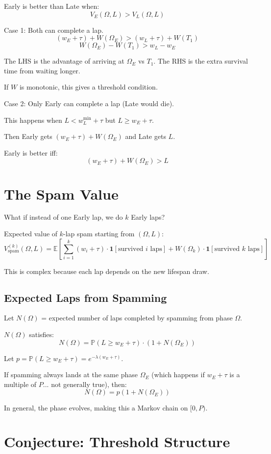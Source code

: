 \documentclass{article}
\newcommand{\E}{\mathbb{E}}
\newcommand{\Prob}{\mathbb{P}}
\newcommand{\ind}{\mathbf{1}}
\begin{document}
Early is better than Late when:
\[
V_E(\Omega, L) > V_L(\Omega, L)
\]

Case 1: Both can complete a lap.
\[
(w_E + \tau) + W(\Omega_E) > (w_L + \tau) + W(T_1)
\]
\[
W(\Omega_E) - W(T_1) > w_L - w_E
\]

The LHS is the advantage of arriving at $\Omega_E$ vs $T_1$.
The RHS is the extra survival time from waiting longer.

If $W$ is monotonic, this gives a threshold condition.

Case 2: Only Early can complete a lap (Late would die).

This happens when $L < w_L^{\min} + \tau$ but $L \geq w_E + \tau$.

Then Early gets $(w_E + \tau) + W(\Omega_E)$ and Late gets $L$.

Early is better iff:
\[
(w_E + \tau) + W(\Omega_E) > L
\]

\section{The Spam Value}

What if instead of one Early lap, we do $k$ Early laps?

Expected value of $k$-lap spam starting from $(\Omega, L)$:
\[
V_{\text{spam}}^{(k)}(\Omega, L) = \E\left[\sum_{i=1}^{k} (w_i + \tau) \cdot \ind[\text{survived } i \text{ laps}] + W(\Omega_k) \cdot \ind[\text{survived } k \text{ laps}]\right]
\]

This is complex because each lap depends on the new lifespan draw.

\subsection{Expected Laps from Spamming}

Let $N(\Omega)$ = expected number of laps completed by spamming from phase $\Omega$.

$N(\Omega)$ satisfies:
\[
N(\Omega) = \Prob(L \geq w_E + \tau) \cdot (1 + N(\Omega_E))
\]

Let $p = \Prob(L \geq w_E + \tau) = e^{-\lambda(w_E + \tau)}$.

If spamming always lands at the same phase $\Omega_E$ (which happens if $w_E + \tau$ is a multiple of $P$... not generally true), then:
\[
N(\Omega) = p(1 + N(\Omega_E))
\]

In general, the phase evolves, making this a Markov chain on $[0, P)$.

\section{Conjecture: Threshold Structure}
\end{document}
